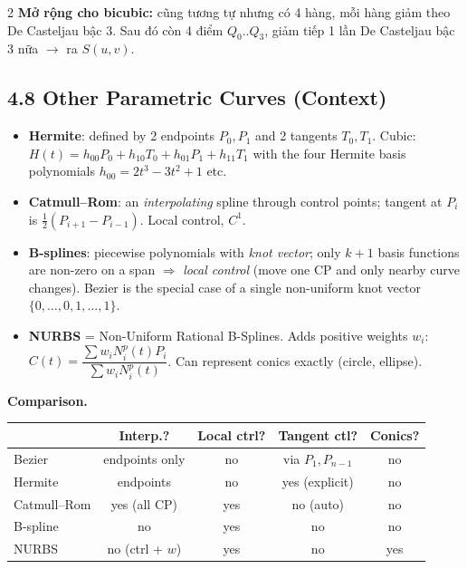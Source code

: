 \begin{paracol}{2}
\medskip
\textbf{Mở rộng cho bicubic:} cũng tương tự nhưng có 4 hàng, mỗi hàng giảm theo De Casteljau bậc 3. Sau đó còn 4 điểm $Q_0..Q_3$, giảm tiếp 1 lần De Casteljau bậc 3 nữa $\to$ ra $S(u,v)$.

\switchcolumn*

\subsection*{4.8 Other Parametric Curves (Context)}

\begin{itemize}[leftmargin=*,nosep]
  \item \textbf{Hermite}: defined by 2 endpoints $P_0,P_1$ and 2 tangents $T_0,T_1$. Cubic: $H(t)=h_{00}P_0+h_{10}T_0+h_{01}P_1+h_{11}T_1$ with the four Hermite basis polynomials $h_{00}=2t^3-3t^2+1$ etc.
  \item \textbf{Catmull--Rom}: an \emph{interpolating} spline through control points; tangent at $P_i$ is $\tfrac12(P_{i+1}-P_{i-1})$. Local control, $C^1$.
  \item \textbf{B-splines}: piecewise polynomials with \emph{knot vector}; only $k{+}1$ basis functions are non-zero on a span $\Rightarrow$ \emph{local control} (move one CP and only nearby curve changes). Bezier is the special case of a single non-uniform knot vector $\{0,\dots,0,1,\dots,1\}$.
  \item \textbf{NURBS} = Non-Uniform Rational B-Splines. Adds positive weights $w_i$:
        $C(t)=\dfrac{\sum w_i N_i^{p}(t) P_i}{\sum w_i N_i^{p}(t)}$. Can represent conics exactly (circle, ellipse).
\end{itemize}

\textbf{Comparison.}
\begin{center}\scriptsize
\begin{tabular}{@{}lcccc@{}}\toprule
 & Interp.? & Local ctrl? & Tangent ctl? & Conics? \\\midrule
Bezier         & endpoints only & no  & via $P_1,P_{n-1}$ & no \\
Hermite        & endpoints      & no  & yes (explicit)    & no \\
Catmull--Rom   & yes (all CP)   & yes & no (auto)         & no \\
B-spline       & no             & yes & no                & no \\
NURBS          & no (ctrl + $w$)& yes & no                & yes \\\bottomrule
\end{tabular}
\end{center}


\end{paracol}
